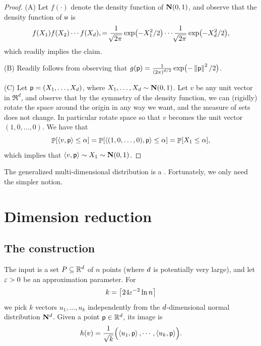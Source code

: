 \begin{proof}
    (A) Let $f(\cdot)$ denote the density function of
    $\NormalY{0}{1}$, and observe that the density function of $\mathsf{u}$ is
    \begin{equation*}
        f(X_1) f(X_2) \cdots f(X_\hdim),
        = %
        \frac{1}{\mysqrt{2\pi}} \exp \pth{ -X_1^2/2}
        \cdots
        \frac{1}{\mysqrt{2\pi}} \exp \pth{ -X_\hdim^2/2},
    \end{equation*}
    which readily implies the claim.

    
    (B) Readily follows from observing that
    $g(\pnt)=\frac{1}{\pth{2\pi}^{\hdim/2} } \exp\bigl( -
    \norm{\pnt}^2/2\bigr)$. 

    (C) Let $\mathsf{p} = (X_1, \ldots, X_d)$, where
    $X_1,\ldots, X_d \sim \NormalY{0}{1}$.  Let $v$ be any unit vector
    in $\Re^d$, and observe that by the symmetry of the density
    function, we can (rigidly) rotate the space around the origin in
    any way we want, and the measure of sets does not change. In
    particular rotate space so that $v$ becomes the unit vector
    $(1,0,\ldots, 0)$. We have that
    \begin{equation*}
        \Prob{ \DotProd{v}{\pnt} \leq \alpha}%
        =%
        \Prob{ \DotProd{(1, 0, \ldots, 0)}{\pnt} \leq \alpha}%
        =%
        \Prob{ X_1 \leq \alpha},
    \end{equation*}
    which implies that
    $\DotProd{v}{\pnt} \sim X_1 \sim \NormalY{0}{1}$. 
\end{proof}

The generalized multi-dimensional distribution is a
. Fortunately, we only need the simpler notion.



\section{Dimension reduction}

\subsection{The construction}

The input is a set $P \subseteq \mathbb{R}^d$ of $n$ points (where
$d$ is potentially very large), and let ${\varepsilon} >0$ be an
approximation parameter. For
\begin{equation}
    k = \ceil{24\eps^{-2} \ln n}
    \eqlab{k:val:j:l}%
\end{equation}
we pick $k$ vectors $u_1, \ldots, u_k$ independently from the
$d$-dimensional normal distribution $\mathbf{N}^{d}$. Given a
point $\mathsf{p} \in \mathbb{R}^d$, its image is
\begin{equation*}
    h(v)%
    =%
    \frac{1}{\sqrt{k}} \Bigl( \DotProd{u_1}{\pnt}, \cdots,
    \DotProd{u_k}{\pnt} \Bigr).     
\end{equation*}

